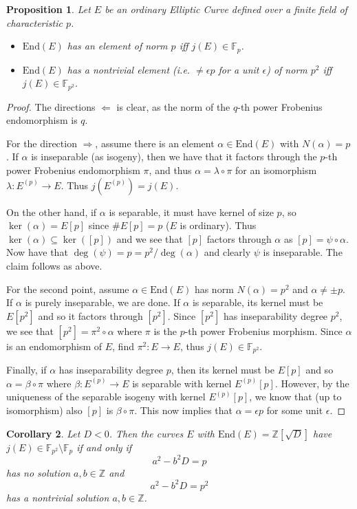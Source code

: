 \documentclass{scrartcl}
\newcommand{\Z}{\mathbb{Z}}
\newcommand{\F}{\mathbb{F}}
\newcommand{\End}{\mathrm{End}}
\newtheorem{prop}{Proposition}[section]
\newtheorem{corollary}[prop]{Corollary}
\theoremstyle{definition}
\begin{document}
\begin{prop}
    \label{prop:defined_fp_endo_ring}
    Let $E$ be an ordinary Elliptic Curve defined over a finite field of characteristic $p$.
    \begin{itemize}
        \item $\End(E)$ has an element of norm $p$ iff $j(E) \in \F_p$.
        \item $\End(E)$ has a nontrivial element (i.e. $\neq \epsilon p$ for a unit $\epsilon$) of norm $p^2$ iff $j(E) \in \F_{p^2}$. 
    \end{itemize}
\end{prop}
\begin{proof}
    The directions $\Leftarrow$ is clear, as the norm of the $q$-th power Frobenius endomorphism is $q$.

    For the direction $\Rightarrow$, assume there is an element $\alpha \in \End(E)$ with $N(\alpha) = p$.
    If $\alpha$ is inseparable (as isogeny), then we have that it factors through the $p$-th power Frobenius endomorphism $\pi$, and thus $\alpha = \lambda \circ \pi$ for an isomorphism $\lambda: E^{(p)} \to E$.
    Thus $j(E^{(p)}) = j(E)$.

    On the other hand, if $\alpha$ is separable, it must have kernel of size $p$, so $\ker(\alpha) = E[p]$ since $\#E[p] = p$ ($E$ is ordinary).
    Thus $\ker(\alpha) \subseteq \ker([p])$ and we see that $[p]$ factors through $\alpha$ as $[p] = \psi \circ \alpha$.
    Now have that $\deg(\psi) = p = p^2/\deg(\alpha)$ and clearly $\psi$ is inseparable.
    The claim follows as above.

    For the second point, assume $\alpha \in \End(E)$ has norm $N(\alpha) = p^2$ and $\alpha \neq \pm p$.
    If $\alpha$ is purely inseparable, we are done.
    If $\alpha$ is separable, its kernel must be $E[p^2]$ and so it factors through $[p^2]$.
    Since $[p^2]$ has inseparability degree $p^2$, we see that $[p^2] = \pi^2 \circ \alpha$ where $\pi$ is the $p$-th power Frobenius morphism.
    Since $\alpha$ is an endomorphism of $E$, find $\pi^2: E \to E$, thus $j(E) \in \F_{p^2}$.

    Finally, if $\alpha$ has inseparability degree $p$, then its kernel must be $E[p]$ and so $\alpha = \beta \circ \pi$ where $\beta: E^{(p)} \to E$ is separable with kernel $E^{(p)}[p]$.
    However, by the uniqueness of the separable isogeny with kernel $E^{(p)}[p]$, we know that (up to isomorphism) also $[p]$ is $\beta \circ \pi$.
    This now implies that $\alpha = \epsilon p$ for some unit $\epsilon$.
\end{proof}
\begin{corollary}
    Let $D < 0$.
    Then the curves $E$ with $\End(E) = \Z[\sqrt{D}]$ have $j(E) \in \F_{p^2} \setminus \F_p$ if and only if
    \begin{equation*}
        a^2 - b^2 D = p
    \end{equation*}
    has no solution $a, b \in \Z$ and
    \begin{equation*}
        a^2 - b^2 D = p^2
    \end{equation*}
    has a nontrivial solution $a, b \in \Z$.
\end{corollary}
\end{document}
